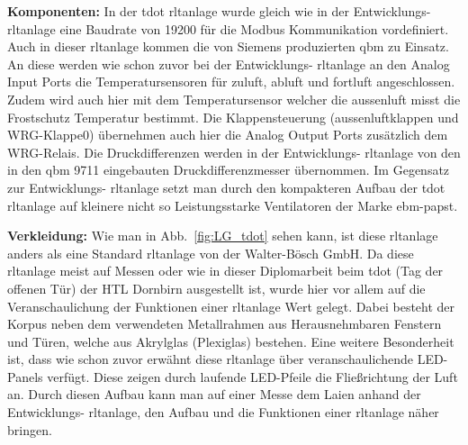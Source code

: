 \textbf{Komponenten:}
In der \gls{tdot} \ac{rltanlage} wurde gleich wie in der Entwicklungs- \ac{rltanlage} eine Baudrate von 19200 für die Modbus Kommunikation vordefiniert. Auch in dieser \ac{rltanlage} kommen die von Siemens produzierten \gls{qbm} zu Einsatz. An diese werden wie schon zuvor bei der Entwicklungs- \ac{rltanlage} an den Analog Input Ports die Temperatursensoren für \gls{zuluft}, \gls{abluft} und \gls{fortluft} angeschlossen. Zudem wird auch hier mit dem Temperatursensor welcher die \gls{aussenluft} misst die Frostschutz Temperatur bestimmt. Die Klappensteuerung (\gls{aussenluft}klappen und WRG-Klappe0) übernehmen auch hier die Analog Output Ports zusätzlich dem WRG-Relais. Die Druckdifferenzen werden in der Entwicklungs- \ac{rltanlage} von den in den \gls{qbm} 9711 eingebauten Druckdifferenzmesser übernommen. Im Gegensatz zur Entwicklungs- \ac{rltanlage} setzt man durch den kompakteren Aufbau der \gls{tdot} \ac{rltanlage} auf kleinere nicht so Leistungsstarke Ventilatoren der Marke ebm-papst. 


\textbf{Verkleidung:}
Wie man in Abb.~\ref{fig:LG_tdot} sehen kann, ist diese \ac{rltanlage} anders als eine Standard \ac{rltanlage} von der Walter-Bösch GmbH. Da diese \ac{rltanlage} meist auf Messen oder wie in dieser Diplomarbeit beim \gls{tdot} (Tag der offenen Tür) der HTL Dornbirn ausgestellt ist, wurde hier vor allem auf die Veranschaulichung der Funktionen einer \ac{rltanlage} Wert gelegt. Dabei besteht der Korpus neben dem verwendeten Metallrahmen aus Herausnehmbaren Fenstern und Türen, welche aus Akrylglas (Plexiglas) bestehen. Eine weitere Besonderheit ist, dass wie schon zuvor erwähnt diese \ac{rltanlage} über veranschaulichende LED-Panels verfügt. Diese zeigen durch laufende LED-Pfeile die Fließrichtung der Luft an. Durch diesen Aufbau kann man auf \zB einer Messe dem Laien anhand der Entwicklungs- \ac{rltanlage}, den Aufbau und die Funktionen einer \ac{rltanlage} näher bringen.


